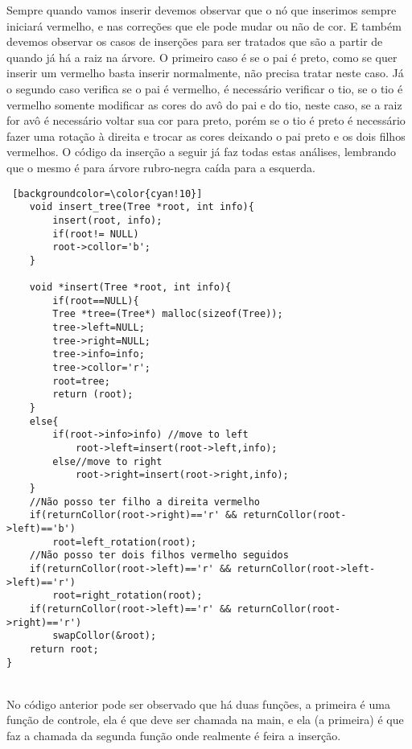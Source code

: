 \documentclass[report]{uftex}
\begin{document}
    Sempre quando vamos inserir devemos observar que o nó que inserimos sempre iniciará vermelho, e nas correções que ele pode mudar ou não de cor. E também devemos observar os casos de inserções para ser tratados que são a partir de quando já há a raiz na árvore. O primeiro caso é se o pai é preto, como se quer inserir um vermelho basta inserir normalmente, não precisa tratar neste caso. Já o segundo caso verifica se o pai é vermelho, é necessário verificar o tio, se o tio é vermelho somente modificar as cores do avô do pai e do tio, neste caso, se a raiz for avô é necessário voltar sua cor para preto, porém se o tio é preto é necessário fazer uma rotação à direita e trocar as cores deixando o pai preto e os dois filhos vermelhos. O código da inserção a seguir já faz todas estas análises, lembrando que o mesmo é para árvore rubro-negra caída para a esquerda.\\

\begin{lstlisting} [backgroundcolor=\color{cyan!10}]
    void insert_tree(Tree *root, int info){
        insert(root, info);
        if(root!= NULL)
        root->collor='b';
    }

    void *insert(Tree *root, int info){
        if(root==NULL){
        Tree *tree=(Tree*) malloc(sizeof(Tree));
        tree->left=NULL;
        tree->right=NULL;
        tree->info=info;
        tree->collor='r';
        root=tree;
        return (root);
    }
    else{
        if(root->info>info) //move to left
            root->left=insert(root->left,info);
        else//move to right
            root->right=insert(root->right,info);
    }
    //Não posso ter filho a direita vermelho
    if(returnCollor(root->right)=='r' && returnCollor(root->left)=='b')
        root=left_rotation(root);
    //Não posso ter dois filhos vermelho seguidos
    if(returnCollor(root->left)=='r' && returnCollor(root->left->left)=='r')
        root=right_rotation(root);
    if(returnCollor(root->left)=='r' && returnCollor(root->right)=='r')
        swapCollor(&root);
    return root;
}

\end{lstlisting}

\\
    No código anterior pode ser observado que há duas funções, a primeira é uma função de controle, ela é que deve ser chamada na main, e ela (a primeira) é que faz a chamada da segunda função onde realmente é feira a inserção.
\end{document}
